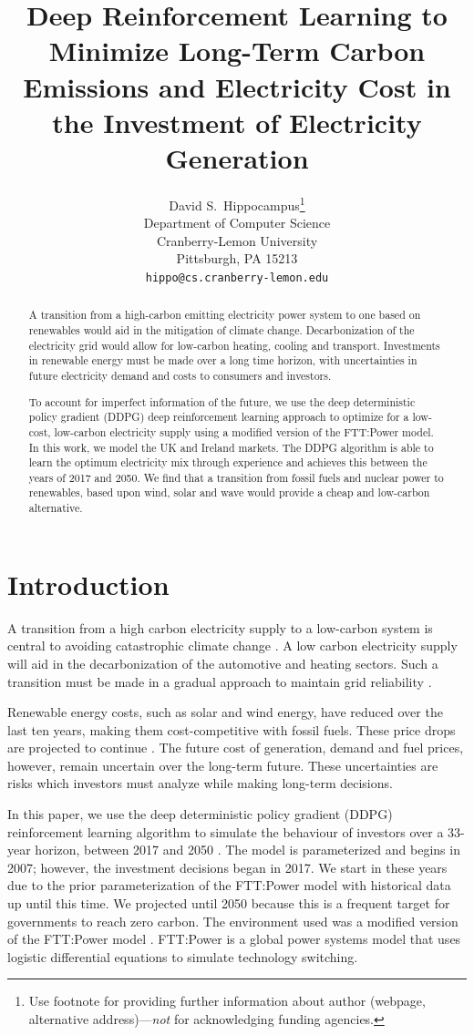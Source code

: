 \documentclass{article}
\title{Deep Reinforcement Learning to Minimize Long-Term Carbon Emissions and Electricity Cost in the Investment of Electricity Generation}
\author{%
  David S.~Hippocampus\thanks{Use footnote for providing further information
    about author (webpage, alternative address)---\emph{not} for acknowledging
    funding agencies.} \\
  Department of Computer Science\\
  Cranberry-Lemon University\\
  Pittsburgh, PA 15213 \\
  \texttt{hippo@cs.cranberry-lemon.edu} \\
}
\begin{document}
\maketitle

\begin{abstract}

A transition from a high-carbon emitting electricity power system to one based on renewables would aid in the mitigation of climate change. Decarbonization of the electricity grid would allow for low-carbon heating, cooling and transport. Investments in renewable energy must be made over a long time horizon, with uncertainties in future electricity demand and costs to consumers and investors. 

To account for imperfect information of the future, we use the deep deterministic policy gradient (DDPG) deep reinforcement learning approach to optimize for a low-cost, low-carbon electricity supply using a modified version of the FTT:Power model. In this work, we model the UK and Ireland markets. The DDPG algorithm is able to learn the optimum electricity mix through experience and achieves this between the years of 2017 and 2050. We find that a transition from fossil fuels and nuclear power to renewables, based upon wind, solar and wave would provide a cheap and low-carbon alternative.

\end{abstract}




\section{Introduction}
\label{sec:intro}


A transition from a high carbon electricity supply to a low-carbon system is central to avoiding catastrophic climate change \cite{Kell2020}. A low carbon electricity supply will aid in the decarbonization of the automotive and heating sectors. Such a transition must be made in a gradual approach to maintain grid reliability \cite{Kahrl2011}.

Renewable energy costs, such as solar and wind energy, have reduced over the last ten years, making them cost-competitive with fossil fuels. These price drops are projected to continue \cite{IEA2015}. The future cost of generation, demand and fuel prices, however, remain uncertain over the long-term future. These uncertainties are risks which investors must analyze while making long-term decisions.

In this paper, we use the deep deterministic policy gradient (DDPG) reinforcement learning algorithm to simulate the behaviour of investors over a 33-year horizon, between 2017 and 2050 \cite{Hunt2016a}. The model is parameterized and begins in 2007; however, the investment decisions began in 2017. We start in these years due to the prior parameterization of the FTT:Power model with historical data up until this time. We projected until 2050 because this is a frequent target for governments to reach zero carbon. The environment used was a modified version of the FTT:Power model \cite{Mercure2012}. FTT:Power is a global power systems model that uses logistic differential equations to simulate technology switching. 
\end{document}
